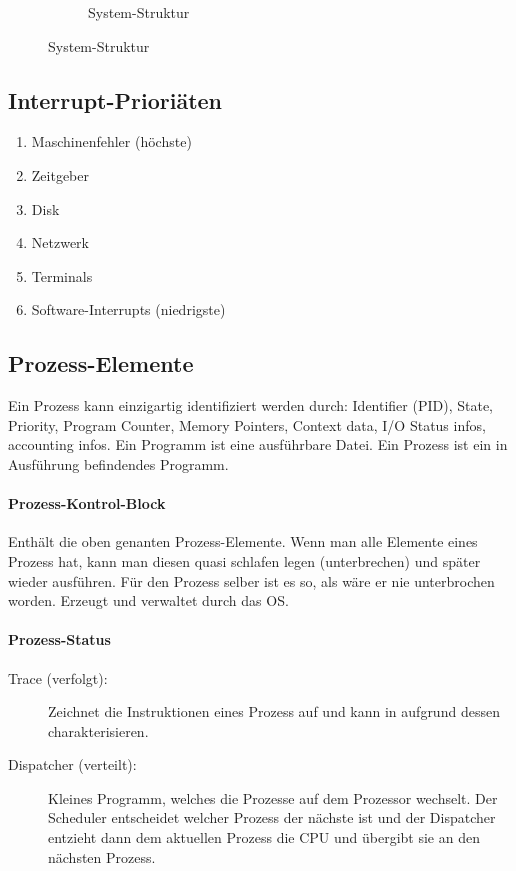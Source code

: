 \begin{figure}[h!]
\begin{subfigure}[b]{0.5\textwidth}
		\caption{System-Struktur}
		\label{fig:system-software-systemkern}
	\end{subfigure}
\end{figure}

\subsection{Interrupt-Prioriäten}
\begin{enumerate}
	\item Maschinenfehler (höchste)
	\item Zeitgeber
	\item Disk
	\item Netzwerk
	\item Terminals
	\item Software-Interrupts (niedrigste)
\end{enumerate}

\subsection{Prozess-Elemente}
Ein Prozess kann einzigartig identifiziert werden durch: Identifier (PID), State, Priority, Program Counter, Memory Pointers, Context data, I/O Status infos, accounting infos. Ein Programm ist eine ausführbare Datei. Ein Prozess ist ein in Ausführung befindendes Programm.

\paragraph{Prozess-Kontrol-Block} Enthält die oben genanten Prozess-Elemente. Wenn man alle Elemente eines Prozess hat, kann man diesen quasi schlafen legen (unterbrechen) und später wieder ausführen. Für den Prozess selber ist es so, als wäre er nie unterbrochen worden. Erzeugt und verwaltet durch das OS.

\paragraph{Prozess-Status}
\begin{description}
	\item[Trace (verfolgt):] Zeichnet die Instruktionen eines Prozess auf und kann in aufgrund dessen charakterisieren.
	\item[Dispatcher (verteilt):] Kleines Programm, welches die Prozesse auf dem Prozessor wechselt. Der Scheduler entscheidet welcher Prozess der nächste ist und der Dispatcher entzieht dann dem aktuellen Prozess die CPU und übergibt sie an den nächsten Prozess.
\end{description}

